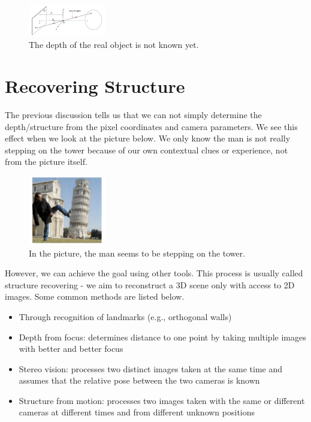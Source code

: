 \documentclass[]{article}
\begin{document}
\begin{figure}[H]
\includegraphics[width=0.3\textwidth]{measuring_depth.png}
\centering
\caption{The depth of the real object is not known yet.}
\label{fig:measuring_depth}
\end{figure}

\section{Recovering Structure}
The previous discussion tells us that we can not simply determine the depth/structure from the pixel coordinates and camera parameters. We see this effect when we look at the picture below. We only know the man is not really stepping on the tower because of our own contextual clues or experience, not from the picture itself.

\begin{figure}[H]
\includegraphics[width=0.3\textwidth]{stepping_on_tower.png}
\centering
\caption{In the picture, the man seems to be stepping on the tower.}
\label{fig:stepping_on_tower}
\end{figure}

However, we can achieve the goal using other tools. This process is usually called structure recovering - we aim to reconstruct a 3D scene only with access to 2D images. Some common methods are listed below.

\begin{itemize}
  \item Through	recognition of landmarks (e.g., orthogonal walls)
  \item Depth from focus: determines distance to one point by taking multiple images with better and better focus
  \item Stereo vision: processes two distinct images taken at the same time and assumes that the relative pose between the two cameras is known
  \item Structure from motion: processes two images taken with the same or different cameras at different times and from different unknown positions
\end{itemize}
\end{document}
